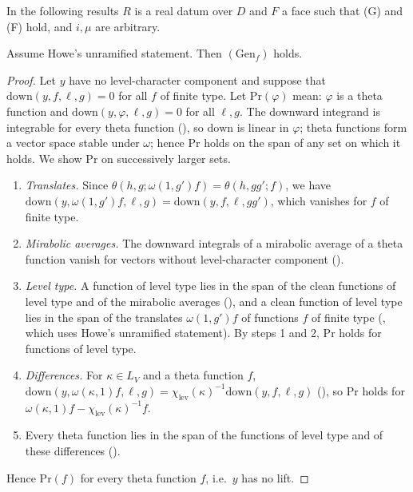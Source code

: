 In the following results $R$ is a real datum over $D$ and $F$ a face such that (G) and (F) hold, and $i,\mu$ are arbitrary.

\begin{lemma}\label{pf:stageU:genfin}
Assume Howe's unramified statement. Then $(\mathrm{Gen}_f)$ holds.
\end{lemma}

\begin{proof}
Let $y$ have no level-character component and suppose that $\mathrm{down}(y,f,\ell,g)=0$ for all $f$ of finite type. Let
$\mathrm{Pr}(\varphi)$ mean: $\varphi$ is a theta function and $\mathrm{down}(y,\varphi,\ell,g)=0$ for all $\ell,g$. The downward integrand
is integrable for every theta function (), so $\mathrm{down}$ is
linear in $\varphi$; theta functions form a vector space stable under $\omega$; hence $\mathrm{Pr}$ holds on the span of any set on
which it holds. We show $\mathrm{Pr}$ on successively larger sets.
\begin{enumerate}[label=\arabic*.]
\item \emph{Translates.} Since $\theta(h,g;\omega(1,g')f)=\theta(h,gg';f)$, we have
$\mathrm{down}(y,\omega(1,g')f,\ell,g)=\mathrm{down}(y,f,\ell,gg')$, which vanishes for $f$ of finite type.
\item \emph{Mirabolic averages.} The downward integrals of a mirabolic average of a theta function vanish for vectors without
level-character component ().
\item \emph{Level type.} A function of level type lies in the span of the clean functions of level type and of the mirabolic
averages (), and a clean function of level type lies in the span
of the translates $\omega(1,g')f$ of functions $f$ of finite type
(, which uses Howe's unramified statement). By steps 1 and 2,
$\mathrm{Pr}$ holds for functions of level type.
\item \emph{Differences.} For $\kappa\in L_V$ and a theta function $f$,
$\mathrm{down}(y,\omega(\kappa,1)f,\ell,g)=\chi_{\mathrm{lev}}(\kappa)^{-1}\mathrm{down}(y,f,\ell,g)$
(), so $\mathrm{Pr}$ holds for
$\omega(\kappa,1)f-\chi_{\mathrm{lev}}(\kappa)^{-1}f$.
\item Every theta function lies in the span of the functions of level type and of these differences
().
\end{enumerate}
Hence $\mathrm{Pr}(f)$ for every theta function $f$, i.e.\ $y$ has no lift.
\end{proof}

